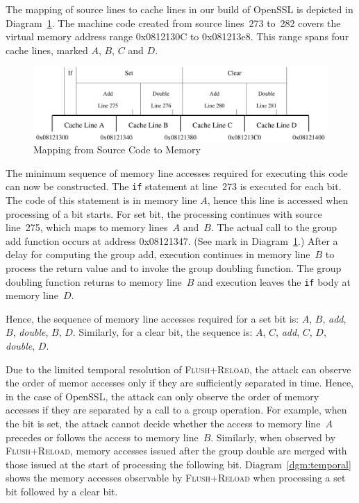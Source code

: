 \documentclass{llncs}
\begin{document}
The mapping of source lines to cache lines in our build of OpenSSL is depicted in Diagram~\ref{dgm:memory}.
The machine code created from source lines~273 to~282 covers the virtual memory address range 0x0812130C
to 0x081213e8.
This range spans four cache lines, marked $A$, $B$, $C$ and $D$.


\begin{figure}[htb]
\centering\includegraphics[width=\columnwidth]{images/memory}
\caption{Mapping from Source Code to Memory\label{dgm:memory}}
\end{figure}


The minimum sequence of memory line accesses required for executing this code can now be constructed.
The \texttt{if} statement at line~273 is executed for each bit.  
The code of this statement is in memory line $A$, hence this line is accessed when processing of a bit starts.
For set bit, the processing continues with source line~275, which maps to memory lines~$A$ and~$B$.
The actual call to the group add function occurs at address 0x08121347.
(See mark in Diagram~\ref{dgm:memory}.)
After a delay for computing the group add, execution continues in memory line~$B$ to process the return value and 
to invoke the group doubling function.
The group doubling function returns to memory line~$B$ and execution leaves the \texttt{if} body at memory line~$D$.

Hence, the sequence of memory line accesses required for a set bit is: $A$, $B$, \textit{add}, $B$, \textit{double}, $B$, $D$.
Similarly, for a clear bit, the sequence is: $A$, $C$, \textit{add}, $C$, $D$, \textit{double}, $D$.

Due to the limited temporal resolution of \textsc{Flush+Reload}, the attack can observe the order of memor accesses only
if they are sufficiently separated in time.
Hence, in the case of OpenSSL, the attack can only observe the order of memory accesses if they are separated by a call
to a group operation.
For example, when the bit is set, the attack cannot decide whether the access to memory line~$A$ precedes or follows the access
to memory line~$B$.
Similarly, when observed by \textsc{Flush+Reload}, memory accesses issued after the group double are merged with those 
issued at the start of processing the following bit.
Diagram~\ref{dgm:temporal} shows the memory accesses observable by \textsc{Flush+Reload} when processing a set bit followed by
a clear bit.
\end{document}
